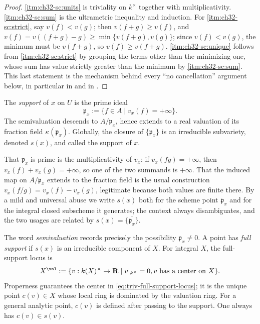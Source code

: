 \begin{proof}
\cref{itm:ch32-sc:units} is triviality on $k^\times$ together with
multiplicativity.  \cref{itm:ch32-sc:sum} is the ultrametric inequality and
induction.  For \cref{itm:ch32-sc:strict}, say $v(f)<v(g)$; then
$v(f+g)\geq v(f)$, and $v(f)=v((f+g)-g)\geq\min\{v(f+g),v(g)\}$; since
$v(f)<v(g)$, the minimum must be $v(f+g)$, so $v(f)\geq v(f+g)$.
\cref{itm:ch32-sc:unique} follows from \cref{itm:ch32-sc:strict} by grouping
the terms other than the minimizing one, whose sum has value strictly
greater than the minimum by \cref{itm:ch32-sc:sum}.  This last statement is
the mechanism behind every ``no cancellation'' argument below, in
particular in  and in
.
\end{proof}

\begin{definition}
\label{def:triv-support}
The \emph{support} of $x$ on $U$ is the prime ideal
\[
                 \mathfrak p_x:=\{f\in A\mid v_x(f)=+\infty\}.
\]
The semivaluation descends to $A/\mathfrak p_x$, hence extends to a
real valuation of its fraction field
$\kappa(\mathfrak p_x)$.  Globally, the closure of
$\{\mathfrak p_x\}$ is an irreducible subvariety, denoted
$s(x)$, and called the support of $x$.
\end{definition}

That $\mathfrak p_x$ is prime is the multiplicativity of $v_x$: if
$v_x(fg)=+\infty$, then $v_x(f)+v_x(g)=+\infty$, so one of the two
summands is $+\infty$.  That the induced map on $A/\mathfrak p_x$
extends to the fraction field is the usual construction
$v_x(f/g)=v_x(f)-v_x(g)$, legitimate because both values are finite there.
By a mild and universal abuse we write $s(x)$ both for the scheme point
$\mathfrak p_x$ and for the integral closed subscheme it generates; the
context always disambiguates, and the two usages are related by
$s(x)=\overline{\{\mathfrak p_x\}}$.

The word \emph{semivaluation} records precisely the possibility
$\mathfrak p_x\ne0$.  A point has \emph{full support} if $s(x)$ is
an irreducible component of $X$.  For integral $X$, the full-support
locus is
\begin{equation}
\label{eq:triv-full-support-locus}
 X^{\val}:=\{v:k(X)^\times\to\mathbf R\mid v|_{k^\times}=0,
                    \text{$v$ has a center on $X$}\}.
\end{equation}
Properness guarantees the center in \eqref{eq:triv-full-support-locus}; it is
the unique point $c(v)\in X$ whose local ring is dominated by the valuation
ring.  For a general analytic point, $c(v)$ is defined after passing to the
support.  One always has $c(v)\in s(v)$.

